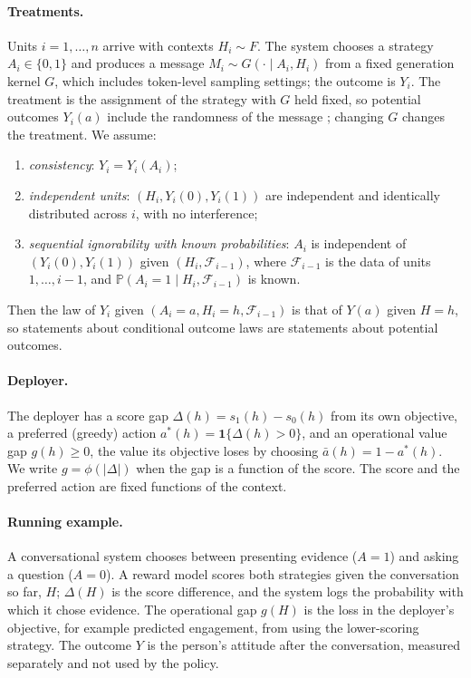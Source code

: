 \documentclass[12pt]{article}
\theoremstyle{definition}
\theoremstyle{remark}
\newcommand{\Prob}{\mathbb{P}}
\begin{document}
\paragraph{Treatments.} Units $i=1,\dots,n$ arrive with contexts $H_i\sim F$.
The system chooses a strategy $A_i\in\{0,1\}$ and produces a message
$M_i\sim G(\cdot\mid A_i,H_i)$ from a fixed generation kernel $G$, which includes
token-level sampling settings; the outcome is $Y_i$. The treatment is the
assignment of the strategy with $G$ held fixed, so potential outcomes $Y_i(a)$
include the randomness of the message
\cite{munoz2012population,young2014identification}; changing $G$ changes the
treatment. We assume:
\begin{enumerate}[label=(C\arabic*),leftmargin=3em,itemsep=1pt]
\item \emph{consistency}: $Y_i=Y_i(A_i)$;
\item \emph{independent units}: $(H_i,Y_i(0),Y_i(1))$ are independent and
identically distributed across $i$, with no interference;
\item \emph{sequential ignorability with known probabilities}: $A_i$ is independent
of $(Y_i(0),Y_i(1))$ given $(H_i,\mathcal F_{i-1})$, where $\mathcal F_{i-1}$ is
the data of units $1,\dots,i-1$, and $\Prob(A_i=1\mid H_i,\mathcal F_{i-1})$ is known.
\end{enumerate}
Then the law of $Y_i$ given $(A_i=a,H_i=h,\mathcal F_{i-1})$ is that of $Y(a)$
given $H=h$, so statements about conditional outcome laws are statements about
potential outcomes.

\paragraph{Deployer.} The deployer has a score gap $\Delta(h)=s_1(h)-s_0(h)$
from its own objective, a preferred (greedy) action $a^*(h)=\mathbf 1\{\Delta(h)>0\}$,
and an operational value gap $g(h)\ge0$, the value its objective loses by choosing
$\bar a(h)=1-a^*(h)$. We write $g=\phi(|\Delta|)$ when the gap is a function of the
score. The score and the preferred action are fixed functions of the context.

\paragraph{Running example.} A conversational system chooses between presenting
evidence ($A=1$) and asking a question ($A=0$). A reward model scores both
strategies given the conversation so far, $H$; $\Delta(H)$ is the score difference,
and the system logs the probability with which it chose evidence. The operational
gap $g(H)$ is the loss in the deployer's objective, for example predicted
engagement, from using the lower-scoring strategy. The outcome $Y$ is the person's
attitude after the conversation, measured separately and not used by the policy.
\end{document}
